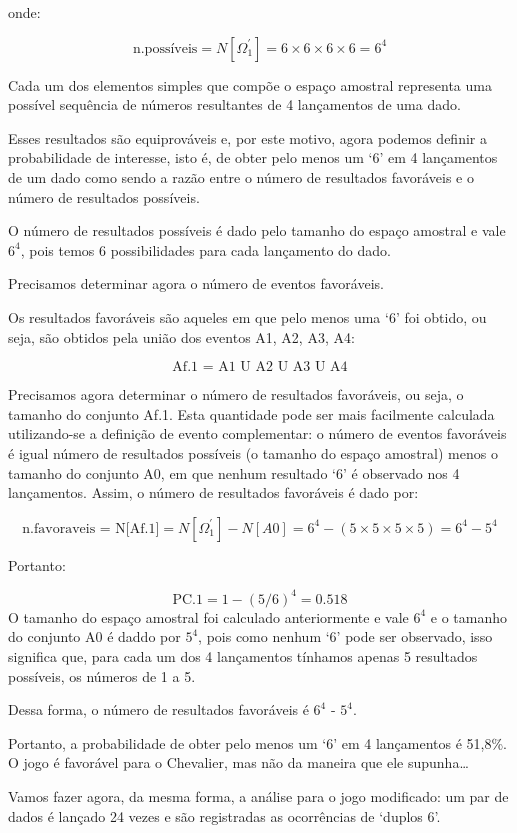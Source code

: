 \documentclass[
]{book}
\theoremstyle{definition}
\theoremstyle{definition}
\theoremstyle{definition}
\theoremstyle{remark}
\begin{document}
onde:

\[\text{n.possíveis} =  {N[\Omega_1^\prime]= 6 \times 6 \times 6 \times 6 = 6^4}\]

Cada um dos elementos simples que compõe o espaço amostral representa uma possível sequência de números resultantes de 4 lançamentos de uma dado.

Esses resultados são equiprováveis e, por este motivo, agora podemos definir a probabilidade de interesse, isto é, de obter pelo menos um `6' em 4 lançamentos de um dado como sendo a razão entre o número de resultados favoráveis e o número de resultados possíveis.

O número de resultados possíveis é dado pelo tamanho do espaço amostral e vale \(6^4\), pois temos 6 possibilidades para cada lançamento do dado.

Precisamos determinar agora o número de eventos favoráveis.

Os resultados favoráveis são aqueles em que pelo menos uma `6' foi obtido, ou seja, são obtidos pela união dos eventos A1, A2, A3, A4:

\[\text{Af.1 = A1 U A2 U A3 U A4}\]

Precisamos agora determinar o número de resultados favoráveis, ou seja, o tamanho do conjunto Af.1. Esta quantidade pode ser mais facilmente calculada utilizando-se a definição de evento complementar: o número de eventos favoráveis é igual número de resultados possíveis (o tamanho do espaço amostral) menos o tamanho do conjunto A0, em que nenhum resultado `6' é observado nos 4 lançamentos. Assim, o número de resultados favoráveis é dado por:

\[\text{n.favoraveis = N[Af.1]} =  {N[\Omega_1^\prime] - N[A0] = 6^4 - (5 \times 5 \times 5 \times 5) = 6^4 - 5^4}\]

Portanto:

\[\text{PC.1} =  {1 - (5/6)^4 = 0.518}\]
O tamanho do espaço amostral foi calculado anteriormente e vale \(6^4\) e o tamanho do conjunto A0 é daddo por \(5^4\), pois como nenhum `6' pode ser observado, isso significa que, para cada um dos 4 lançamentos tínhamos apenas 5 resultados possíveis, os números de 1 a 5.

Dessa forma, o número de resultados favoráveis é \(6^4\) - \(5^4\).

Portanto, a probabilidade de obter pelo menos um `6' em 4 lançamentos é 51,8\%. O jogo é favorável para o Chevalier, mas não da maneira que ele supunha\ldots{}

Vamos fazer agora, da mesma forma, a análise para o jogo modificado: um par de dados é lançado 24 vezes e são registradas as ocorrências de `duplos 6'.
\end{document}
